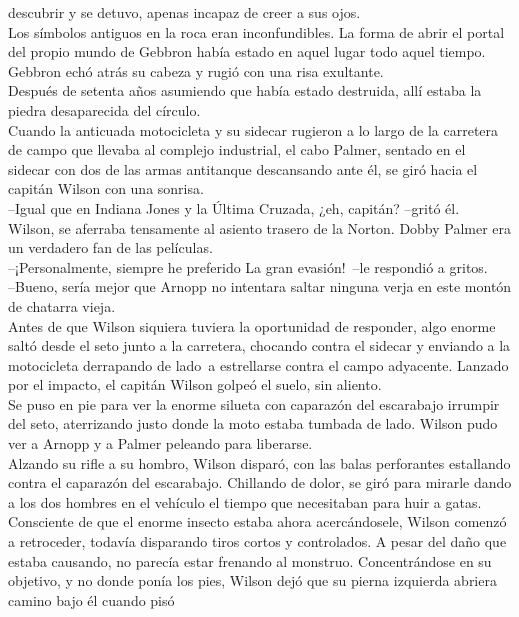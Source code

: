 descubrir y se detuvo, apenas incapaz de creer a sus ojos.\\
Los símbolos antiguos en la roca eran inconfundibles. La forma de abrir
el portal del propio mundo de Gebbron había estado en aquel lugar todo
aquel tiempo. Gebbron echó atrás su cabeza y rugió con una risa
exultante.\\
Después de setenta años asumiendo que había estado destruida, allí
estaba la piedra desaparecida del círculo.\\[2\baselineskip]Cuando la
anticuada motocicleta y su sidecar rugieron a lo largo de la carretera
de campo que llevaba al complejo industrial, el cabo Palmer, sentado en
el sidecar con dos de las armas antitanque descansando ante él, se giró
hacia el capitán Wilson con una sonrisa.\\
--Igual que en Indiana Jones y la Última Cruzada, ¿eh, capitán? --gritó
él.\\
Wilson, se aferraba tensamente al asiento trasero de la Norton. Dobby
Palmer era un verdadero fan de las películas.\\
--¡Personalmente, siempre he preferido La gran evasión!~--le respondió
a gritos.\\
--Bueno, sería mejor que Arnopp no intentara saltar ninguna verja en
este montón de chatarra vieja.\\
Antes de que Wilson siquiera tuviera la oportunidad de responder, algo
enorme saltó desde el seto junto a la carretera, chocando contra el
sidecar y enviando a la motocicleta derrapando de lado~a estrellarse
contra el campo adyacente. Lanzado por el impacto, el capitán Wilson
golpeó el suelo, sin aliento.\\
Se puso en pie para ver la enorme silueta con caparazón del escarabajo
irrumpir del seto, aterrizando justo donde la moto estaba tumbada de
lado. Wilson pudo ver a Arnopp y a Palmer peleando para liberarse.\\
Alzando su rifle a su hombro, Wilson disparó, con las balas perforantes
estallando contra el caparazón del escarabajo. Chillando de dolor, se
giró para mirarle dando a los dos hombres en el vehículo el tiempo que
necesitaban para huir a gatas.\\
Consciente de que el enorme insecto estaba ahora acercándosele, Wilson
comenzó a retroceder, todavía disparando tiros cortos y controlados. A
pesar del daño que estaba causando, no parecía estar frenando al
monstruo. Concentrándose en su objetivo, y no donde ponía los pies,
Wilson dejó que su pierna izquierda abriera camino bajo él cuando pisó
